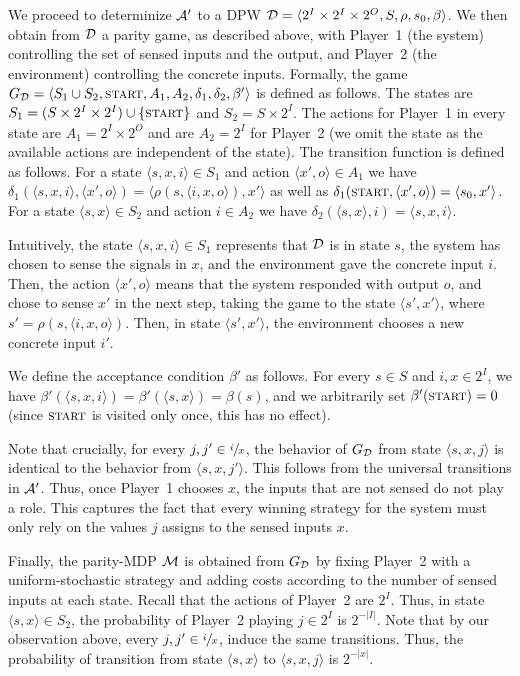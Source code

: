 \documentclass[runningheads,a4paper]{llncs}
\newcommand{\set}[1]{{\{#1\}}}
\newcommand{\zug}[1]{\langle #1  \rangle}
\newcommand{\A}{{\cal A}}
\newcommand{\D}{{\cal D}}
\newcommand{\M}{{\cal M}}
\newcommand{\tIN}{{2^I}}
\newcommand{\tOUT}{{2^O}}
\newcommand{\Act}{A}
\newcommand{\start}{{\textsc{start}}}
\begin{document}
{We proceed to determinize $\A'$ to a DPW $\D=\zug{\tIN\times \tIN\times \tOUT,S,\rho,s_0,\beta}$. We then obtain from $\D$ a parity game, as described above, with Player~1 (the system) controlling the set of sensed inputs and the output, and Player~2 (the environment) controlling the concrete inputs. Formally, the game 
$G_\D=\zug{S_1\cup S_2,\start,\Act_1,\Act_2,\delta_1, \delta_2,\beta'}$ is defined as follows. The states are $S_1=(S\times \tIN\times \tIN)\cup \set{\start}$ and $S_2=S\times \tIN$. The actions for Player~1 in every state are $\Act_1=\tIN\times \tOUT$ and are $\Act_2=\tIN$ for Player~2 (we omit the state as the available actions are independent of the state). The transition function is defined as follows. For a state $\zug{s,x,i}\in S_1$ and action $\zug{x',o}\in A_1$ we have $\delta_1(\zug{s,x,i},\zug{x',o})=\zug{\rho(s,\zug{i,x,o}),x'}$ as well as $\delta_1(\start,\zug{x',o})=\zug{s_0,x'}$. 
For a state $\zug{s,x}\in S_2$ and action $i\in A_2$ we have $\delta_2(\zug{s,x},i)=\zug{s,x,i}$. 

Intuitively, the state $\zug{s,x,i}\in S_1$ represents that $\D$ is in state $s$, the system has chosen to sense the signals in $x$, and the environment gave the concrete input $i$. Then, the action $\zug{x',o}$ means that the system responded with output $o$, and chose to sense $x'$ in the next step, taking the game to the state $\zug{s',x'}$, where $s'=\rho(s,\zug{i,x,o})$. Then, in state $\zug{s',x'}$, the environment chooses a new concrete input $i'$.

We define the acceptance condition $\beta'$ as follows. For every $s\in S$ and $i,x\in \tIN$, we have $\beta'(\zug{s,x,i})=\beta'(\zug{s,x})=\beta(s)$, and we arbitrarily set $\beta'(\start)=0$ (since $\start$ is visited only once, this has no effect).

Note that crucially, for every $j,j'\in \sfrac{i}{x}$, the behavior of $G_\D$ from state $\zug{s,x,j}$ is identical to the behavior from $\zug{s,x,j'}$. This follows from the universal transitions in $\A'$. Thus, once Player~1 chooses $x$, the inputs that are not sensed do not play a role. This captures the fact that every winning strategy for the system must only rely on the values $j$ assigns to the sensed inputs $x$.

Finally, the parity-MDP $\M$ is obtained from $G_\D$ by fixing Player~2 with a uniform-stochastic strategy and adding costs according to the number of sensed inputs at each state. Recall that the actions of Player~2 are $\tIN$. Thus, in state $\zug{s,x}\in S_2$, the probability of Player~2 playing $j\in \tIN$ is $2^{-|I|}$. Note that by our observation above, every $j,j'\in \sfrac{i}{x}$, induce the same transitions. Thus, the probability of transition from state $\zug{s,x}$ to $\zug{s,x,j}$ is $2^{-|x|}$.

}
\end{document}
